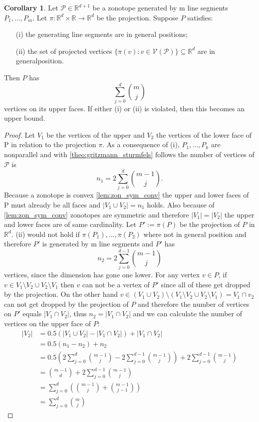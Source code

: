 \documentclass{article}
\theoremstyle{definition}
\newtheorem{corollary}[theorem]{Corollary}
\begin{document}
\begin{corollary}
Let $\mathcal{P} \in \mathbb{R}^{d+1}$ be a zonotope generated by m line segments $P_1 , \dots , P_m$. Let $\pi : \mathbb{R}^{d} \times \mathbb{R} \to \mathbb{R}^{d}$ be the projection. Suppose $P$ satisfies:
\begin{itemize}
\item[(i)]
the generating line segments are in general positions;
\item[(ii)]
the set of projected vertices $\{ \pi(v) : v \in \mathcal{V}(\mathcal{P}) \} \subseteq \mathbb{R}^{d}$ are in generalposition.
\end{itemize}
Then $P$ has
$$ \sum_{j=0}^{d} \binom{m}{j} $$
vertices on its upper faces. If either (i) or (ii) is violated, then this becomes an upper bound. \cite[p.~4]{zhang2018tropical}
\end{corollary}
\begin{proof}
Let $V_{1}$ be the vertices of the upper and $V_{2}$ the vertices of the lower face of P in relation to the projection $\pi$. As a consequence of (i), $P_{1}, \dots , P_{k}$ are nonparallel and with \ref{theo:gritzmann_sturmfels} follows the number of vertices of $\mathcal{P}$ is 
$$n_{1} = 2 \sum^{d}_{j=0} \binom{m-1}{j}.$$ 
Because a zonotope is convex \ref{lem:zon_sym_conv} the upper and lower faces of P must already be all faces and $|V_{1} \cup V_{2}| = n_{1}$ holds. Also because of \ref{lem:zon_sym_conv} zonotopes are symmetric and therefore $|V_{1}| = |V_{2}|$ the upper and lower faces are of same cardinality. Let $P' := \pi (P)$ be the projection of $P$ in $\mathbb{R}^{d}$. (ii) would not hold if $\pi(P_{1}), \dots , \pi(P_{2})$ where not in general position and therefore $P'$ is generated by m line segments and $P'$ has 
$$n_{2}=2 \sum^{d-1}_{j=0} \binom{m-1}{j}$$
vertices, since the dimension has gone one lower. For any vertex $v \in P$, if $v \in V_{1} \setminus V_{2} \cup V_{2} \setminus V_{1}$ then $v$ can not be a vertex of $P'$ since all of these get dropped by the projection. On the other hand $v \in (V_{1} \cup V_{2}) \setminus (V_{1} \setminus V_{2} \cup V_{2} \setminus V_{1}) = V_{1} \cap v_{2}$ can not get dropped by the projection of $P$ and therefore the number of vertices on $P'$ equals $|V_{1} \cap V_{2}|$, thus $n_{2} = |V_{1} \cap V_{2}|$ and we can calculate the number of vertices on the upper face of $P$:
\begin{align*}
|V_{2}|
&= 0.5(|V_{1} \cup V_{2}| - |V_{1} \cap V_{2}|) + |V_{1} \cap V_{2}| \\
&= 0.5(n_{1} - n_{2}) + n_{2} \\
&= 0.5(2 \sum^{d}_{j=0} \binom{m-1}{j} - 2 \sum^{d-1}_{j=0} \binom{m-1}{j}) + 2 \sum^{d-1}_{j=0} \binom{m-1}{j} \\
&= \binom{m-1}{d} + 2 \sum^{d-1}_{j=0} \binom{m-1}{j} \\
&= \sum^{d}_{j=0}(\binom{m-1}{j} + \binom{m-1}{j-1}) \\
&= \sum^{d}_{j=0} \binom{m}{j}
\end{align*}
\end{proof}
\end{document}
